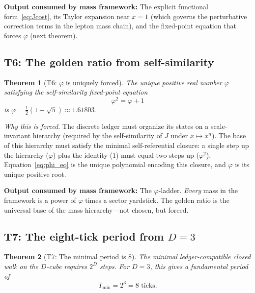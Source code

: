 \documentclass[11pt,a4paper]{article}
\newtheorem{theorem}{Theorem}[section]
\theoremstyle{definition}
\theoremstyle{remark}
\newcommand{\phig}{\varphi}
\newcommand{\Jcost}{J}
\begin{document}
\noindent\textbf{Output consumed by mass framework:}
The explicit functional form~\eqref{eq:Jcost}, its Taylor expansion near
$x = 1$ (which governs the perturbative correction terms in the lepton mass
chain), and the fixed-point equation that forces $\phig$ (next theorem).

\subsection{T6: The golden ratio from self-similarity}

\begin{theorem}[T6: $\phig$ is uniquely forced]
\label{thm:T6}
The unique positive real number $\phig$ satisfying the self-similarity
fixed-point equation
\begin{equation}
  \phig^2 = \phig + 1
  \label{eq:phi_eq}
\end{equation}
is $\phig = \tfrac{1}{2}(1+\sqrt{5}) \approx 1.61803$.
\end{theorem}

\noindent\textit{Why this is forced.}\quad
The discrete ledger must organize its states on a scale-invariant hierarchy
(required by the self-similarity of $\Jcost$ under $x \mapsto x^n$).
The base of this hierarchy must satisfy the minimal self-referential closure:
a single step up the hierarchy ($\phig$) plus the identity ($1$) must equal
two steps up ($\phig^2$).  Equation~\eqref{eq:phi_eq} is the unique
polynomial encoding this closure, and $\phig$ is its unique positive root.

\medskip
\noindent\textbf{Output consumed by mass framework:}
The $\phig$-ladder.  \emph{Every} mass in the framework is a power of $\phig$
times a sector yardstick.  The golden ratio is the universal base of the mass
hierarchy---not chosen, but forced.

\subsection{T7: The eight-tick period from $D = 3$}

\begin{theorem}[T7: The minimal period is 8]
\label{thm:T7}
The minimal ledger-compatible closed walk on the $D$-cube requires $2^D$
steps.  For $D = 3$, this gives a fundamental period of
\begin{equation}
  T_{\min} = 2^3 = 8 \text{ ticks}.
  \label{eq:eight_tick}
\end{equation}
\end{theorem}
\end{document}
